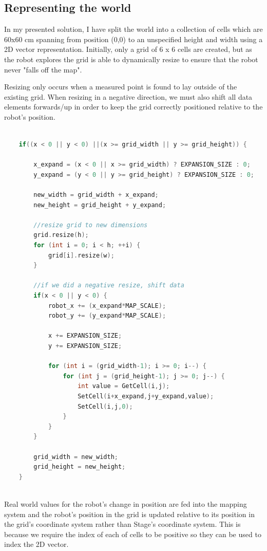 \documentclass{article}
\begin{document}
\subsection{Representing the world}
In my presented solution, I have split the world into a collection of cells which are 60x60 cm spanning from position (0,0) to an unspecified height and width using a 2D vector representation. Initially, only a grid of 6 x 6 cells are created, but as the robot explores the grid is able to dynamically resize to ensure that the robot never "falls off the map". 

Resizing only occurs when a measured point is found to lay outside of the existing grid. When resizing in a negative direction, we must also shift all data elements forwards/up in order to keep the grid correctly positioned relative to the robot's position.

\begin{center}
	\begin{lstlisting}[language=c++, showstringspaces=false, caption={C++ code for dynamically resizing the grid when a point (x,y) falls outside the current grid's size}]

	if((x < 0 || y < 0) ||(x >= grid_width || y >= grid_height)) {
		
		x_expand = (x < 0 || x >= grid_width) ? EXPANSION_SIZE : 0;
		y_expand = (y < 0 || y >= grid_height) ? EXPANSION_SIZE : 0;

		new_width = grid_width + x_expand;
		new_height = grid_height + y_expand;

		//resize grid to new dimensions
		grid.resize(h);
		for (int i = 0; i < h; ++i) {
 			grid[i].resize(w);
 		}
		
		//if we did a negative resize, shift data
		if(x < 0 || y < 0) {
			robot_x += (x_expand*MAP_SCALE);
			robot_y += (y_expand*MAP_SCALE);

			x += EXPANSION_SIZE;
			y += EXPANSION_SIZE;

			for (int i = (grid_width-1); i >= 0; i--) {
				for (int j = (grid_height-1); j >= 0; j--) {
					int value = GetCell(i,j);
					SetCell(i+x_expand,j+y_expand,value);
					SetCell(i,j,0);
				}
			}
		}

		grid_width = new_width;
		grid_height = new_height;
	}
		
	\end{lstlisting}
\end{center}

Real world values for the robot's change in position are fed into the mapping system and the robot's position in the grid is updated relative to its position in the grid's coordinate system rather than Stage's coordinate system. This is because we require the index of each of cells to be positive so they can be used to index the 2D vector.
\end{document}
